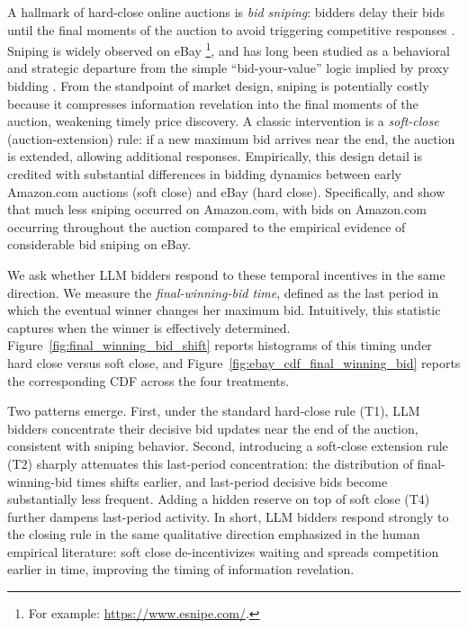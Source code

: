 A hallmark of hard-close online auctions is \emph{bid sniping}: bidders delay their bids until the final moments of the auction to avoid triggering competitive responses . Sniping is widely observed on eBay \footnote{For example: \url{https://www.esnipe.com/}.}, and has long been studied as a behavioral and strategic departure from the simple ``bid-your-value'' logic implied by proxy bidding \citep{roth2002last}.
From the standpoint of market design, sniping is potentially costly because it compresses information revelation into the final moments of the auction, weakening timely price discovery. 
A classic intervention is a \emph{soft-close} (auction-extension) rule: if a new maximum bid arrives near the end, the auction is extended, allowing additional responses. Empirically, this design detail is credited with substantial differences in bidding dynamics between early Amazon.com auctions (soft close) and eBay (hard close).
Specifically, \citet{roth2002last} and \citet{ockenfels2006late} show that much less sniping occurred on Amazon.com, with bids on Amazon.com occurring throughout the auction compared to the empirical evidence of considerable bid
sniping on eBay. 


We ask whether LLM bidders respond to these temporal incentives in the same direction. We measure the \emph{final-winning-bid time}, defined as the last period in which the eventual winner changes her maximum bid. Intuitively, this statistic captures when the winner is effectively determined. Figure~\ref{fig:final_winning_bid_shift} reports histograms of this timing under hard close versus soft close, and Figure~\ref{fig:ebay_cdf_final_winning_bid} reports the corresponding CDF across the four treatments.

Two patterns emerge. First, under the standard hard-close rule (T1), LLM bidders concentrate their decisive bid updates near the end of the auction, consistent with sniping behavior. Second, introducing a soft-close extension rule (T2) sharply attenuates this last-period concentration: the distribution of final-winning-bid times shifts earlier, and last-period decisive bids become substantially less frequent. Adding a hidden reserve on top of soft close (T4) further dampens last-period activity. In short, LLM bidders respond strongly to the closing rule in the same qualitative direction emphasized in the human empirical literature: soft close de-incentivizes waiting and spreads competition earlier in time, improving the timing of information revelation.

%

